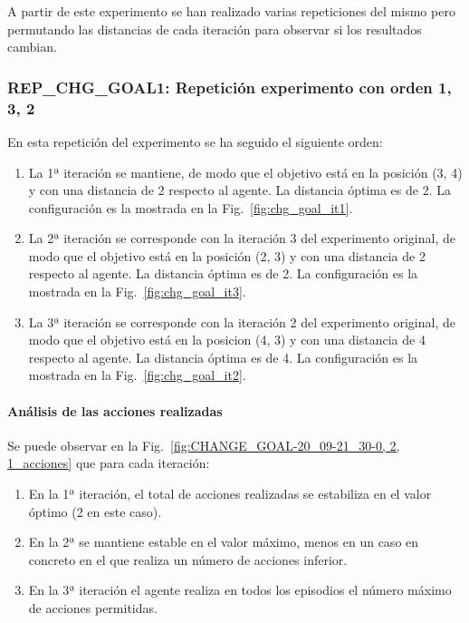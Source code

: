 A partir de este experimento se han realizado varias repeticiones del mismo pero permutando las distancias de cada iteración para observar si los resultados cambian. 

\subsubsection{REP\_CHG\_GOAL1: Repetición experimento con orden 1, 3, 2} \label{REP_CHG_GOAL1}

En esta repetición del experimento se ha seguido el siguiente orden: 
\begin{enumerate}
    \item La 1ª iteración se mantiene, de modo que el objetivo está en la posición (3, 4) y con una distancia de 2 respecto al agente. La distancia óptima es de 2. La configuración es la mostrada en la Fig.~\ref{fig:chg_goal_it1}.
    \item La 2ª iteración se corresponde con la iteración 3 del experimento original, de modo que el objetivo está en la posición (2, 3) y con una distancia de 2 respecto al agente. La distancia óptima es de 2. La configuración es la mostrada en la Fig.~\ref{fig:chg_goal_it3}.
    \item La 3ª iteración se corresponde con la iteración 2 del experimento original, de modo que el objetivo está en la posicion (4, 3) y con una distancia de 4 respecto al agente. La distancia óptima es de 4. La configuración es la mostrada en la Fig.~\ref{fig:chg_goal_it2}.
\end{enumerate}

\paragraph{Análisis de las acciones realizadas}

Se puede observar en la Fig.~\ref{fig:CHANGE_GOAL-20_09-21_30-0, 2, 1_acciones} que para cada iteración: 
\begin{enumerate}
    \item En la 1ª iteración, el total de acciones realizadas se estabiliza en el valor óptimo (2 en este caso). 
    \item En la 2ª se mantiene estable en el valor máximo, menos en un caso en concreto en el que realiza un número de acciones inferior.
    \item En la 3ª iteración el agente realiza en todos los episodios el número máximo de acciones permitidas. 
\end{enumerate}

